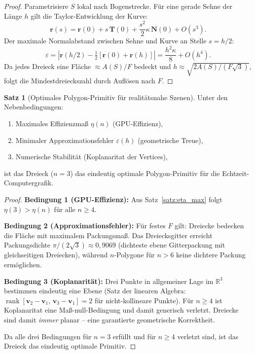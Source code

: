 ﻿\documentclass[a4paper,12pt]{article}
\theoremstyle{definition}
\newtheorem{satz}{Satz}[section]
\newcommand{\R}{\mathbb{R}}
\newcommand{\vect}[1]{\boldsymbol{#1}}
\newcommand{\abs}[1]{\left|#1\right|}
\begin{document}
\begin{proof}
Parametrisiere $S$ lokal nach Bogenstrecke. F\"ur eine gerade Sehne der
L\"ange $h$ gilt die Taylor-Entwicklung der Kurve:
\[
	\vect{r}(s) = \vect{r}(0) + s\,\vect{T}(0) + \frac{s^2}{2}\kappa\,\vect{N}(0) + O(s^3).
\]
Der maximale Normalabstand zwischen Sehne und Kurve an Stelle $s = h/2$:
\[
	\varepsilon = \abs{\vect{r}(h/2) - \tfrac{1}{2}[\vect{r}(0)+\vect{r}(h)]}
	= \frac{h^2\kappa}{8} + O(h^4).
\]
Da jedes Dreieck eine Fl\"ache $\approx A(S)/F$ bedeckt und
$h \approx \sqrt{2A(S)/(F\sqrt{3})}$, folgt die Mindestdreieckszahl
durch Aufl\"osen nach $F$.
\end{proof}

\begin{satz}[Optimales Polygon-Primitiv f\"ur realit\"atsnahe Szenen]
\label{satz:optimal}
Unter den Nebenbedingungen:
\begin{enumerate}
	\item Maximales Effizienzma\ss{} $\eta(n)$ (GPU-Effizienz),
	\item Minimaler Approximationsfehler $\varepsilon(h)$ (geometrische Treue),
	\item Numerische Stabilit\"at (Koplanaritat der Vertices),
\end{enumerate}
ist das Dreieck ($n = 3$) das eindeutig optimale Polygon-Primitiv
f\"ur die Echtzeit-Computergrafik.
\end{satz}

\begin{proof}
\textbf{Bedingung 1 (GPU-Effizienz):} Aus Satz~\ref{satz:eta_max} folgt
$\eta(3) > \eta(n)$ f\"ur alle $n \geq 4$.

\textbf{Bedingung 2 (Approximationsfehler):} F\"ur festes $F$ gilt:
Dreiecke bedecken die Fl\"ache mit maximalem Packungsma\ss{}. Das
Dreiecksgitter erreicht Packungsdichte $\pi/(2\sqrt{3}) \approx 0{,}9069$
(dichteste ebene Gitterpackung mit gleichseitigen Dreiecken), w\"ahrend
$n$-Polygone f\"ur $n > 6$ keine dichtere Packung erm\"oglichen.

\textbf{Bedingung 3 (Koplanarit\"at):} Drei Punkte in allgemeiner Lage
im $\R^3$ bestimmen eindeutig eine Ebene (Satz der linearen Algebra:
$\operatorname{rank}[\vect{v}_2 - \vect{v}_1,\, \vect{v}_3 - \vect{v}_1] = 2$
f\"ur nicht-kollineare Punkte). F\"ur $n \geq 4$ ist Koplanaritat eine
Ma\ss{}-null-Bedingung und damit generisch verletzt. Dreiecke sind damit
\emph{immer} planar -- eine garantierte geometrische Korrektheit.

Da alle drei Bedingungen f\"ur $n = 3$ erf\"ullt und f\"ur $n \geq 4$
verletzt sind, ist das Dreieck das eindeutig optimale Primitiv.
\end{proof}
\end{document}
